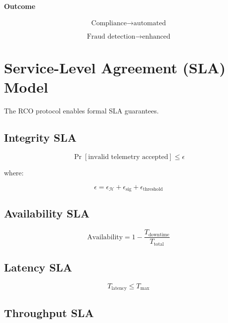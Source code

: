 \paragraph{Outcome}

\begin{equation}
\text{Compliance} \rightarrow \text{automated}
\end{equation}

\begin{equation}
\text{Fraud detection} \rightarrow \text{enhanced}
\end{equation}

\section{Service-Level Agreement (SLA) Model}

The RCO protocol enables formal SLA guarantees.

\subsection{Integrity SLA}

\begin{equation}
\Pr[\text{invalid telemetry accepted}] \leq \epsilon
\end{equation}

where:

\begin{equation}
\epsilon = \epsilon_{\mathcal{H}} + \epsilon_{\text{sig}} + \epsilon_{\text{threshold}}
\end{equation}

\subsection{Availability SLA}

\begin{equation}
\text{Availability} = 1 - \frac{T_{\text{downtime}}}{T_{\text{total}}}
\end{equation}

\subsection{Latency SLA}

\begin{equation}
T_{\text{latency}} \leq T_{\max}
\end{equation}

\subsection{Throughput SLA}

